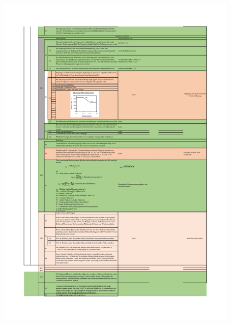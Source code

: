 \begin{table}[H]
\centering
\includegraphics[width=0.9\textwidth]{bilder/Tabellen/MPP_Konstruktion_6.pdf}
\end{table}

